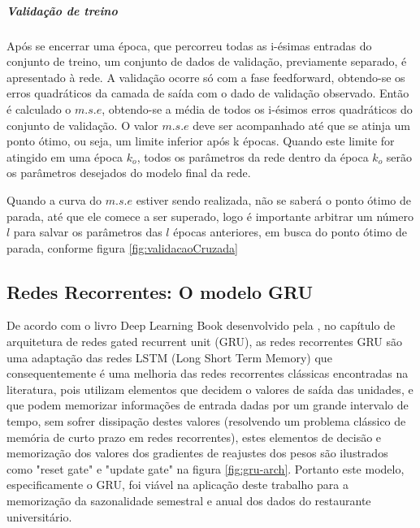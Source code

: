             \subparagraph{Validação de treino}
                Após se encerrar uma época, que percorreu todas as i-ésimas entradas do conjunto de treino, um conjunto de dados de validação, previamente separado, é apresentado à rede.
                A validação ocorre só com a fase feedforward, obtendo-se os erros quadráticos da camada de saída com o dado de validação observado.
                Então é calculado o $m.s.e$, obtendo-se a média de todos os i-ésimos erros quadráticos do conjunto de validação.
                O valor $m.s.e$ deve ser acompanhado até que se atinja um ponto ótimo, ou seja, um limite inferior após k épocas.
                Quando este limite for atingido em uma época $k_o$, todos os parâmetros da rede dentro da época $k_o$ serão os parâmetros desejados do modelo final da rede.
                
                Quando a curva do $m.s.e$ estiver sendo realizada, não se saberá o ponto ótimo de parada, até que ele comece a ser superado, logo é importante arbitrar um número $l$ para salvar os parâmetros das $l$ épocas anteriores, em busca do ponto ótimo de parada, conforme figura \ref{fig:validacaoCruzada}
        
        \subsection{Redes Recorrentes: O modelo GRU}
         	De acordo com  o livro Deep Learning Book desenvolvido pela  , no capítulo de arquitetura de redes gated recurrent unit (GRU), as redes recorrentes GRU são uma adaptação das redes LSTM (Long Short Term Memory) que consequentemente é uma melhoria das redes recorrentes clássicas encontradas na literatura, pois utilizam elementos que decidem o valores de saída das unidades, e que podem memorizar informações de entrada dadas por um grande intervalo de tempo, sem sofrer dissipação destes valores (resolvendo um problema clássico de memória de curto prazo em redes recorrentes), estes elementos de decisão e memorização dos valores dos gradientes de reajustes dos pesos são ilustrados como "reset gate" e "update gate" na figura \ref{fig:gru-arch}. Portanto este modelo, especificamente o GRU, foi viável na aplicação deste trabalho para a memorização da sazonalidade semestral e anual dos dados do restaurante universitário.
         	
            \begin{figure}[H]
            \end{figure}